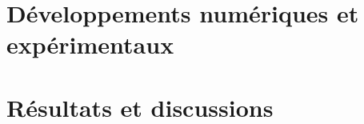 \documentclass{0_Sources/ClassThesis}
\begin{document}


    \cleardoublepage%

    \cleardoublepage%

    \cleardoublepage%


%
\part{Développements numériques et expérimentaux}%
\label{part:Developpements_numeriques_et_experimentaux}


              
    \cleardoublepage%

    \cleardoublepage%

    \cleardoublepage%


%
\part{Résultats et discussions}%
\label{part:Resultats_et_discussions}



    \cleardoublepage%

    \cleardoublepage%



    \cleardoublepage%

    \cleardoublepage%


\appendix
\renewcommand{\chaptername}{Annexe}                             %
\end{document}
